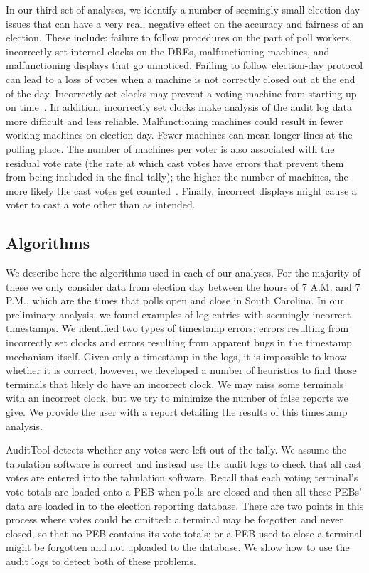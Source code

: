 \documentclass[letterpaper,twocolumn,10pt]{article}
\begin{document}
In our third set of analyses, we identify a number of seemingly small
election-day issues that can have a very real, negative effect on the accuracy
and fairness of an election. These include:
failure to follow procedures on the part of poll workers, incorrectly set
internal clocks on the DREs, malfunctioning machines, and malfunctioning
displays that go unnoticed.  
Failling to follow election-day protocol can lead to a loss of votes when a
machine is not correctly closed out at the end of the day. Incorrectly set
clocks may prevent a voting machine from starting up on
time~\cite{VotUn2007}. In addition, incorrectly set clocks make analysis of the
audit log data more difficult and less reliable. Malfunctioning machines could
result in fewer working machines on election day. Fewer machines can mean longer
lines at the polling place. The number of machines per voter is also associated
with the residual vote rate (the rate at which cast votes have errors that
prevent them from being included in the final tally); the higher the number of
machines, the more likely the cast votes get counted~\cite{DNC2005}. Finally,
incorrect displays might cause a voter to cast a vote other than as intended.
 
\subsection{Algorithms}
We describe here the algorithms used in each of our analyses. For the
majority of these we only consider data from election day between the hours of
7 A.M. and 7 P.M., which are the times that polls open and close in South
Carolina. In our preliminary analysis, we found examples of log entries with
seemingly incorrect timestamps. We identified two types of timestamp errors:
errors resulting from incorrectly set clocks and errors resulting from apparent
bugs in the timestamp mechanism itself. Given only a timestamp in the logs, it
is impossible to know whether it is correct; however, we developed a number of
heuristics to find those terminals that likely do have an incorrect clock. We
may miss some terminals with an incorrect clock, but we try to minimize the
number of false reports we give. We provide the user with a report detailing the
results of this timestamp analysis.  

AuditTool detects whether any votes were left out of the tally. We assume the
tabulation software is correct and instead use the audit logs to check that all
cast votes are entered into the tabulation software. Recall that each voting
terminal’s vote totals are loaded onto a PEB when polls are closed and then all
these PEBs’ data are loaded in to the election reporting database. There are two
points in this process where votes could be omitted: a terminal may be forgotten
and never closed, so that no PEB contains its vote totals; or a PEB used to
close a terminal might be forgotten and not uploaded to the database. We show
how to use the audit logs to detect both of these problems.  
\end{document}
